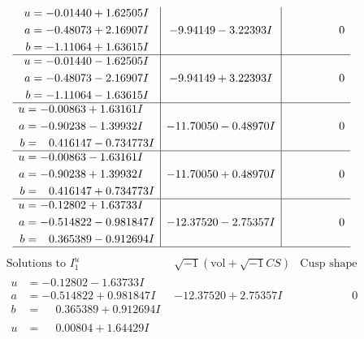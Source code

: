 \documentclass[1p]{elsarticle_modified}
\theoremstyle{definition}
\newcommand{\I}{\sqrt{-1}}
\begin{document}
$$\begin{array}{c|c|c}
\begin{aligned}
u &= -0.01440 + 1.62505 I \\
a &= -0.48073 + 2.16907 I \\
b &= -1.11064 + 1.63615 I\end{aligned}
 & -9.94149 - 3.22393 I & \phantom{-0.000000 } 0 \\ \hline\begin{aligned}
u &= -0.01440 - 1.62505 I \\
a &= -0.48073 - 2.16907 I \\
b &= -1.11064 - 1.63615 I\end{aligned}
 & -9.94149 + 3.22393 I & \phantom{-0.000000 } 0 \\ \hline\begin{aligned}
u &= -0.00863 + 1.63161 I \\
a &= -0.90238 - 1.39932 I \\
b &= \phantom{-}0.416147 - 0.734773 I\end{aligned}
 & -11.70050 - 0.48970 I & \phantom{-0.000000 } 0 \\ \hline\begin{aligned}
u &= -0.00863 - 1.63161 I \\
a &= -0.90238 + 1.39932 I \\
b &= \phantom{-}0.416147 + 0.734773 I\end{aligned}
 & -11.70050 + 0.48970 I & \phantom{-0.000000 } 0 \\ \hline\begin{aligned}
u &= -0.12802 + 1.63733 I \\
a &= -0.514822 - 0.981847 I \\
b &= \phantom{-}0.365389 - 0.912694 I\end{aligned}
 & -12.37520 - 2.75357 I & \phantom{-0.000000 } 0\\
 \hline 
 \end{array}$$\newpage$$\begin{array}{c|c|c}  
\text{Solutions to }I^u_{1}& \I (\text{vol} + \sqrt{-1}CS) & \text{Cusp shape}\\
 \hline 
\begin{aligned}
u &= -0.12802 - 1.63733 I \\
a &= -0.514822 + 0.981847 I \\
b &= \phantom{-}0.365389 + 0.912694 I\end{aligned}
 & -12.37520 + 2.75357 I & \phantom{-0.000000 } 0 \\ \hline\begin{aligned}
u &= \phantom{-}0.00804 + 1.64429 I \\

\end{aligned}
\end{array}$$
\end{document}

